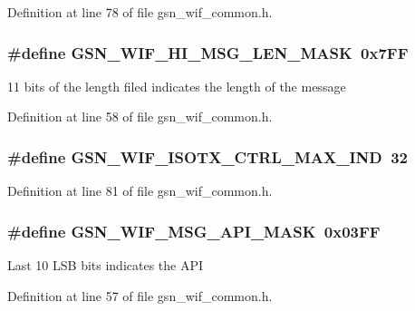 Definition at line 78 of file gsn\_\-wif\_\-common.h.

\hypertarget{a00608_aa680ccc189b1777c2b7e7ae2aecf4137}{
\subsubsection[{GSN\_\-WIF\_\-HI\_\-MSG\_\-LEN\_\-MASK}]{\setlength{\rightskip}{0pt plus 5cm}\#define GSN\_\-WIF\_\-HI\_\-MSG\_\-LEN\_\-MASK~0x7FF}}
\label{a00608_aa680ccc189b1777c2b7e7ae2aecf4137}
11 bits of the length filed indicates the length of the message 

Definition at line 58 of file gsn\_\-wif\_\-common.h.

\hypertarget{a00608_acc835c7a1353690ebd624e7223d55a39}{
\subsubsection[{GSN\_\-WIF\_\-ISOTX\_\-CTRL\_\-MAX\_\-IND}]{\setlength{\rightskip}{0pt plus 5cm}\#define GSN\_\-WIF\_\-ISOTX\_\-CTRL\_\-MAX\_\-IND~32}}
\label{a00608_acc835c7a1353690ebd624e7223d55a39}


Definition at line 81 of file gsn\_\-wif\_\-common.h.

\hypertarget{a00608_a179bc8e8f4f110e10eb55e693f7ae535}{
\subsubsection[{GSN\_\-WIF\_\-MSG\_\-API\_\-MASK}]{\setlength{\rightskip}{0pt plus 5cm}\#define GSN\_\-WIF\_\-MSG\_\-API\_\-MASK~0x03FF}}
\label{a00608_a179bc8e8f4f110e10eb55e693f7ae535}
Last 10 LSB bits indicates the API 

Definition at line 57 of file gsn\_\-wif\_\-common.h.

